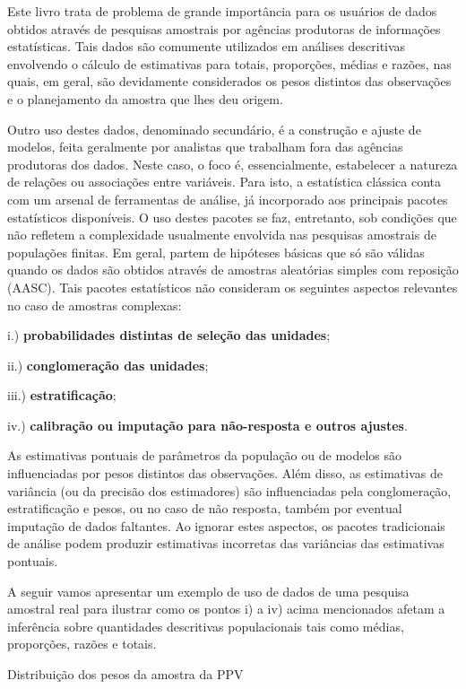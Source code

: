 \documentclass[]{book}
\numberwithin{example}{chapter}
\numberwithin{remark}{chapter}
\numberwithin{definition}{chapter}
\let\BeginKnitrBlock\begin \let\EndKnitrBlock\end
\begin{document}
Este livro trata de problema de grande importância para os usuários de
dados obtidos através de pesquisas amostrais por agências produtoras de
informações estatísticas. Tais dados são comumente utilizados em
análises descritivas envolvendo o cálculo de estimativas para totais,
proporções, médias e razões, nas quais, em geral, são devidamente
considerados os pesos distintos das observações e o planejamento da
amostra que lhes deu origem.

Outro uso destes dados, denominado secundário, é a construção e ajuste
de modelos, feita geralmente por analistas que trabalham fora das
agências produtoras dos dados. Neste caso, o foco é, essencialmente,
estabelecer a natureza de relações ou associações entre variáveis. Para
isto, a estatística clássica conta com um arsenal de ferramentas de
análise, já incorporado aos principais pacotes estatísticos disponíveis.
O uso destes pacotes se faz, entretanto, sob condições que não refletem
a complexidade usualmente envolvida nas pesquisas amostrais de
populações finitas. Em geral, partem de hipóteses básicas que só são
válidas quando os dados são obtidos através de amostras aleatórias
simples com reposição (AASC). Tais pacotes estatísticos não consideram
os seguintes aspectos relevantes no caso de amostras complexas:

i.) \textbf{probabilidades distintas de seleção das unidades};

ii.) \textbf{conglomeração das unidades};

iii.) \textbf{estratificação};

iv.) \textbf{calibração ou imputação para não-resposta e outros
ajustes}.

As estimativas pontuais de parâmetros da população ou de modelos são
influenciadas por pesos distintos das observações. Além disso, as
estimativas de variância (ou da precisão dos estimadores) são
influenciadas pela conglomeração, estratificação e pesos, ou no caso de
não resposta, também por eventual imputação de dados faltantes. Ao
ignorar estes aspectos, os pacotes tradicionais de análise podem
produzir estimativas incorretas das variâncias das estimativas pontuais.

A seguir vamos apresentar um exemplo de uso de dados de uma pesquisa
amostral real para ilustrar como os pontos i) a iv) acima mencionados
afetam a inferência sobre quantidades descritivas populacionais tais
como médias, proporções, razões e totais.

\BeginKnitrBlock{example}
\protect\hypertarget{ex:distppv}{}{\label{ex:distppv}}Distribuição dos pesos
da amostra da PPV
\EndKnitrBlock{example}
\end{document}
